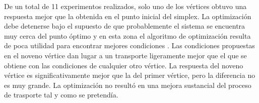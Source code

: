 De un total de 11 experimentos realizados, solo uno de los vértices obtuvo una respuesta mejor que la obtenida en el punto inicial del simplex. La optimización debe detenerse bajo el supuesto de que probablemente el sistema se encuentra muy cerca del punto óptimo y en esta zona el algoritmo de optimización resulta de poca utilidad para encontrar mejores condiciones \citep{simplexbook}. Las condiciones propuestas en el noveno vértice dan lugar a un transporte ligeramente mejor que el que se obtiene con las condiciones de cualquier otro vértice. La respuesta del noveno vértice es significativamente mejor que la del primer vértice, pero la diferencia no es muy grande. La optimización no resultó en una mejora sustancial del proceso de trasporte tal y como se pretendía.


